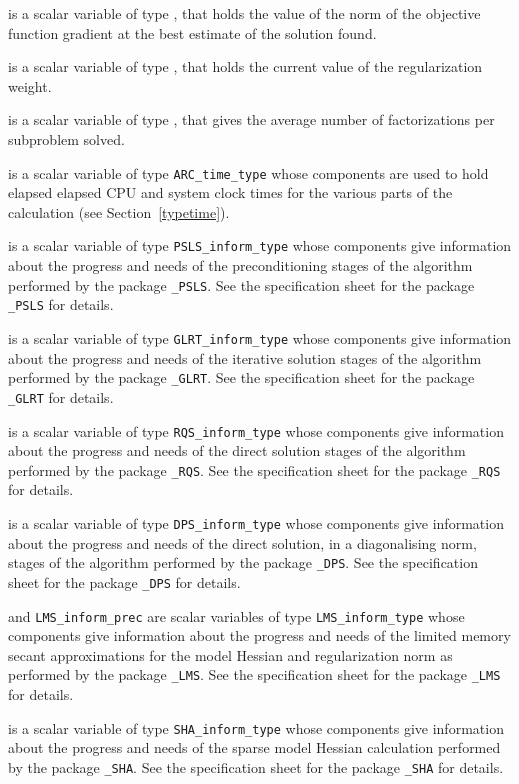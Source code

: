 \documentclass{galahad}
\newcommand{\packagename}{ARC}
\begin{document}
\begin{description}
 is a scalar variable of type \realdp, that holds the
value of the norm of the objective function gradient at the best estimate
of the solution found.

 is a scalar variable of type \realdp, that holds
the current value of the regularization weight.

 is a scalar variable of type \realdp, that
gives the average number of factorizations per subproblem solved.

 is a scalar variable of type {\tt \packagename\_time\_type}
whose components are used to hold elapsed elapsed CPU and system clock
times for the various parts of the calculation (see Section~\ref{typetime}).

 is a scalar variable of type
{\tt PSLS\_inform\_type}
whose components give information about the progress and needs
of the preconditioning stages of the algorithm performed by the package
{\tt \libraryname\_PSLS}.
See the specification sheet for the package
{\tt \libraryname\_PSLS}
for details.

 is a scalar variable of type
{\tt GLRT\_inform\_type}
whose components give information about the progress and needs
of the iterative solution stages of the algorithm performed by the package
{\tt \libraryname\_GLRT}.
See the specification sheet for the package
{\tt \libraryname\_GLRT}
for details.

 is a scalar variable of type
{\tt RQS\_inform\_type}
whose components give information about the progress and needs
of the direct solution stages of the algorithm performed by the package
{\tt \libraryname\_RQS}.
See the specification sheet for the package
{\tt \libraryname\_RQS}
for details.

 is a scalar variable of type
{\tt DPS\_inform\_type}
whose components give information about the progress and needs
of the direct solution, in a diagonalising norm,
stages of the algorithm performed by the package
{\tt \libraryname\_DPS}.
See the specification sheet for the package
{\tt \libraryname\_DPS}
for details.

  and {\tt LMS\_inform\_prec}
are scalar variables of type
{\tt LMS\_inform\_type}
whose components give information about the progress and needs
of the limited memory secant approximations for the model Hessian
and regularization norm as performed by the package
{\tt \libraryname\_LMS}.
See the specification sheet for the package
{\tt \libraryname\_LMS}
for details.

 is a scalar variable of type
{\tt SHA\_inform\_type}
whose components give information about the progress and needs
of the sparse model Hessian calculation performed by the package
{\tt \libraryname\_SHA}.
See the specification sheet for the package
{\tt \libraryname\_SHA}
for details.

\end{description}
\end{document}
